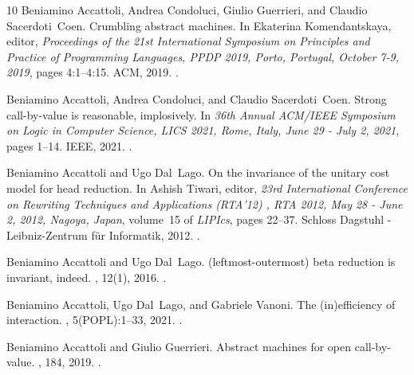 \begin{thebibliography}{10}
Beniamino Accattoli, Andrea Condoluci, Giulio Guerrieri, and Claudio
  Sacerdoti~Coen.
\newblock Crumbling abstract machines.
\newblock In Ekaterina Komendantskaya, editor, {\em Proceedings of the 21st
  International Symposium on Principles and Practice of Programming Languages,
  { PPDP} 2019, Porto, Portugal, October 7-9, 2019}, pages 4:1--4:15. {ACM},
  2019.
\newblock \href {https://doi.org/10.1145/3354166.3354169}
  {}.

Beniamino Accattoli, Andrea Condoluci, and Claudio Sacerdoti~Coen.
\newblock Strong call-by-value is reasonable, implosively.
\newblock In {\em 36th Annual {ACM/IEEE} Symposium on Logic in Computer
  Science, {LICS} 2021, Rome, Italy, June 29 - July 2, 2021}, pages 1--14.
  {IEEE}, 2021.
\newblock \href {https://doi.org/10.1109/LICS52264.2021.9470630}
  {}.

Beniamino Accattoli and Ugo Dal~Lago.
\newblock On the invariance of the unitary cost model for head reduction.
\newblock In Ashish Tiwari, editor, {\em 23rd International Conference on
  Rewriting Techniques and Applications (RTA'12) , {RTA} 2012, May 28 - June 2,
  2012, Nagoya, Japan}, volume~15 of {\em LIPIcs}, pages 22--37. Schloss
  Dagstuhl - Leibniz-Zentrum f{\"{u}}r Informatik, 2012.
\newblock \href {https://doi.org/10.4230/LIPICS.RTA.2012.22}
  {}.

Beniamino Accattoli and Ugo Dal~Lago.
\newblock (leftmost-outermost) beta reduction is invariant, indeed.
, 12(1), 2016.
\newblock \href {https://doi.org/10.2168/LMCS-12(1:4)2016}
  {}.

Beniamino Accattoli, Ugo Dal~Lago, and Gabriele Vanoni.
\newblock The (in)efficiency of interaction.
, 5({POPL}):1--33, 2021.
\newblock \href {https://doi.org/10.1145/3434332} {}.

Beniamino Accattoli and Giulio Guerrieri.
\newblock Abstract machines for open call-by-value.
, 184, 2019.
\newblock \href {https://doi.org/10.1016/J.SCICO.2019.03.002}
  {}.


\end{thebibliography}
